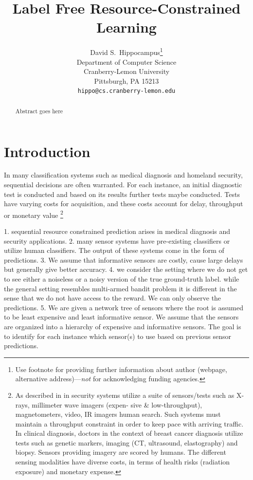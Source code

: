 \documentclass{article}
\title{Label Free Resource-Constrained Learning}
\author{
	David S.~Hippocampus\thanks{Use footnote for providing further
		information about author (webpage, alternative
		address)---\emph{not} for acknowledging funding agencies.} \\
	Department of Computer Science\\
	Cranberry-Lemon University\\
	Pittsburgh, PA 15213 \\
	\texttt{hippo@cs.cranberry-lemon.edu} \\
}
\begin{document}
	
	\maketitle
	
	\begin{abstract}
		Abstract goes here
	\end{abstract}

\section{Introduction}
In many classification systems  such as medical diagnosis  and  homeland  security,  sequential decisions  are  often  warranted.   For each  instance,  an initial diagnostic test  is conducted and based on its results further tests maybe conducted. Tests have varying  costs for  acquisition,  and  these  costs  account  for delay,  throughput  or  monetary  value \footnote{As described in \cite{Trapeznikov} in security systems utilize a suite of sensors/tests such as X-rays, millimeter wave imagers (expen-
sive & low-throughput), magnetometers, video, IR imagers human search.  Such systems  must  maintain  a  throughput  constraint  in  order to  keep  pace  with  arriving  traffic.   In  clinical  diagnosis, doctors  in the context of breast cancer diagnosis utilize tests such as genetic markers, imaging (CT, ultrasound, elastography) and biopsy. Sensors providing imagery are scored by humans. The different sensing  modalities  have  diverse  costs,  in  terms  of  health risks (radiation exposure) and monetary expense.}


1. sequential resource constrained prediction arises in medical diagnosis and security applications.
2. many sensor systems have pre-existing classifiers or utilize human classifiers. The output of these systems come in the form of predictions.
3.  We assume that informative sensors are costly, cause large delays but generally give better accuracy. 
4. we consider the setting where we do not get to see either a noiseless or a noisy version of the true ground-truth label. while the general setting resembles multi-armed bandit problem it is different in the sense that we do not have access to the reward. We can only observe the predictions. 
5. We are given a network tree of sensors where the root is assumed to be least expensive and least informative sensor. We assume that the sensors are organized into a hierarchy of expensive and informative sensors. The goal is to identify for each instance which sensor(s) to use based on previous sensor predictions.
\end{document}
